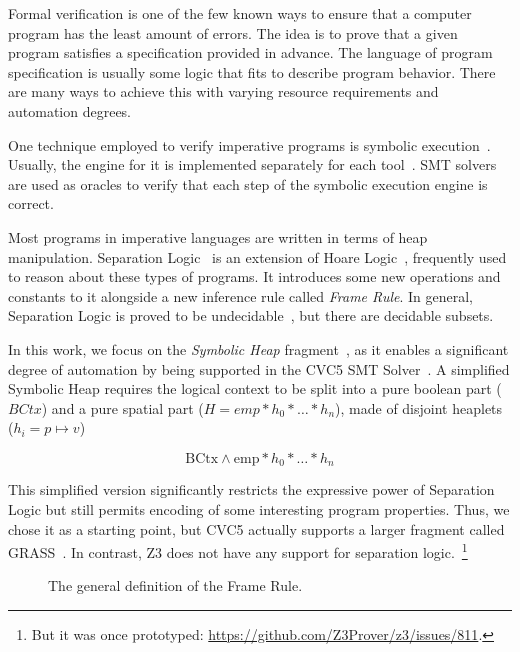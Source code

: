 \documentclass[sigplan,screen,review]{acmart}
\begin{document}
Formal verification is one of the few known ways to ensure that a computer program has the least amount of errors. The idea is to prove that a given program satisfies a specification provided in advance. The language of program specification is usually some logic that fits to describe program behavior. There are many ways to achieve this with varying resource requirements and automation degrees.

One technique employed to verify imperative programs is symbolic execution~\cite{berdine2005symbolic}. Usually, the engine for it is implemented separately for each tool~\cite{DBLP:conf/fmco/BerdineCO05,DBLP:conf/oopsla/DistefanoP08}. SMT solvers are used as oracles to verify that each step of the symbolic execution engine is correct. 

Most programs in imperative languages are written in terms of heap manipulation. Separation Logic~\cite{DBLP:journals/cacm/OHearn19} is an extension of Hoare Logic~\cite{DBLP:journals/cacm/Hoare69}, frequently used to reason about these types of programs. It introduces some new operations and constants to it alongside a new inference rule called \emph{Frame Rule}. In general, Separation Logic is proved to be undecidable~\cite{DBLP:conf/lics/BrotherstonK10}, but there are decidable subsets.

In this work, we focus on the \emph{Symbolic Heap} fragment~\cite{DBLP:conf/fmco/BerdineCO05}, as it enables a significant degree of automation by being supported in the CVC5 SMT Solver~\cite{DBLP:conf/tacas/BarbosaBBKLMMMN22}. A simplified Symbolic Heap requires the logical context to be split into a pure boolean part ($BCtx$) and a pure spatial part ($H = emp * h_0 * \dots * h_n$), made of disjoint heaplets ($h_i = p \mapsto v$)

\[
\text{BCtx} \wedge \text{emp} * h_0 * \dots* h_n
\]

This simplified version significantly restricts the expressive power of Separation Logic but still permits encoding of some interesting program properties. Thus, we chose it as a starting point, but CVC5 actually supports a larger fragment called GRASS~\cite{DBLP:conf/cav/PiskacWZ13}. In contrast, Z3 does not have any support for separation logic.~\footnote{But it was once prototyped: \url{https://github.com/Z3Prover/z3/issues/811}.} 

\begin{figure}
\begin{prooftree}
\end{prooftree}
\caption{The general definition of the Frame Rule.}
\label{fig:framerule}
\end{figure}
\end{document}
